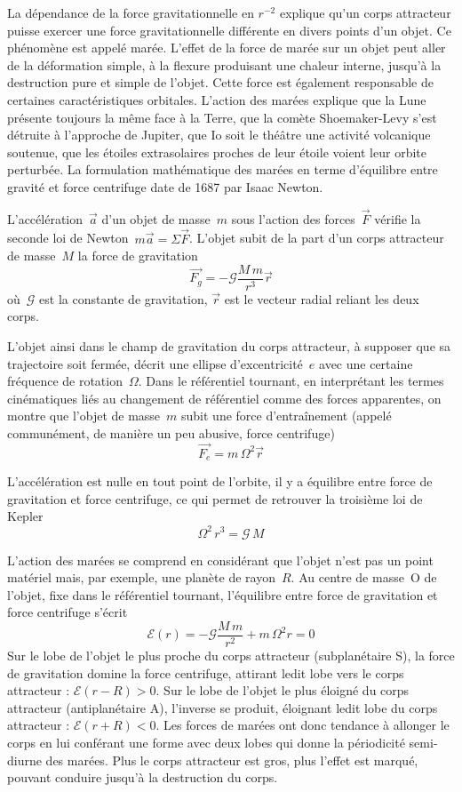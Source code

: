 \sk
La dépendance de la force gravitationnelle en $r^{-2}$ explique qu'un corps attracteur puisse exercer une force gravitationnelle différente en divers points d'un objet. Ce phénomène est appelé marée. L'effet de la force de marée sur un objet peut aller de la déformation simple, à la flexure produisant une chaleur interne, jusqu'à la destruction pure et simple de l'objet. Cette force est également responsable de certaines caractéristiques orbitales. L'action des marées explique que la Lune présente toujours la même face à la Terre, que la comète Shoemaker-Levy s'est détruite à l'approche de Jupiter, que Io soit le théâtre une activité volcanique soutenue, que les étoiles extrasolaires proches de leur étoile voient leur orbite perturbée. La formulation mathématique des marées en terme d'équilibre entre gravité et force centrifuge date de 1687 par Isaac Newton. 

\sk
L'accélération~$\vec{a}$ d'un objet de masse~$m$ sous l'action des forces~$\vec{F}$ vérifie la seconde loi de Newton~$m \vec{a} = \Sigma \vec{F}$. L'objet subit de la part d'un corps attracteur de masse~$M$ la force de gravitation
\[ \vec{F_g} = -\mathcal{G} \frac{M\,m}{r^3} \vec{r} \]
\noindent où~$\mathcal{G}$ est la constante de gravitation, $\vec{r}$ est le vecteur radial reliant les deux corps. 

\sk
L'objet ainsi dans le champ de gravitation du corps attracteur, à supposer que sa trajectoire soit fermée, décrit une ellipse d'excentricité~$e$ avec une certaine fréquence de rotation~$\Omega$. Dans le référentiel tournant, en interprétant les termes cinématiques liés au changement de référentiel comme des forces apparentes, on montre que l'objet de masse~$m$ subit une force d'entraînement (appelé communément, de manière un peu abusive, force centrifuge)
\[ \vec{F_e} = m \, \Omega^2 \vec{r} \]

\sk
L'accélération est nulle en tout point de l'orbite, il y a équilibre entre force de gravitation et force centrifuge, ce qui permet de retrouver la troisième loi de Kepler
\[ \Omega^2 \, r^3 = \mathcal{G} \, M  \]

\sk
L'action des marées se comprend en considérant que l'objet n'est pas un point matériel mais, par exemple, une planète de rayon~$R$. Au centre de masse~O de l'objet, fixe dans le référentiel tournant, l'équilibre entre force de gravitation et force centrifuge s'écrit
\[ \mathcal{E}(r) = -\mathcal{G} \frac{M\,m}{r^2} + m \, \Omega^2 r = 0 \]
Sur le lobe de l'objet le plus proche du corps attracteur (subplanétaire S), la force de gravitation domine la force centrifuge, attirant ledit lobe vers le corps attracteur : $\mathcal{E}(r-R) > 0$. Sur le lobe de l'objet le plus éloigné du corps attracteur (antiplanétaire A), l'inverse se produit, éloignant ledit lobe du corps attracteur : $\mathcal{E}(r+R) < 0$. Les forces de marées ont donc tendance à allonger le corps en lui conférant une forme avec deux lobes qui donne la périodicité semi-diurne des marées. Plus le corps attracteur est gros, plus l'effet est marqué, pouvant conduire jusqu'à la destruction du corps.

